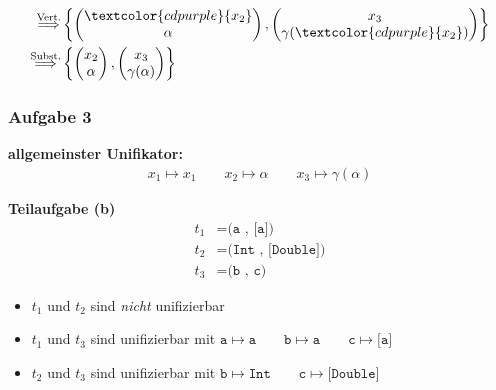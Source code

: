 \documentclass{beamer}
\newcommand{\col}[1]{\textcolor{cdpurple}{#1}}
\begin{document}
\begin{frame}
\begin{align*}
		\overset{\text{Vert.}}{\Longrightarrow}
		&\left\{ \begin{pmatrix}
		\col{x_2} \\ \alpha
		\end{pmatrix}, \begin{pmatrix}
		x_3 \\ \gamma(\col{x_2})
		\end{pmatrix}
		\right\}\\	
		\overset{\text{Subst.}}{\Longrightarrow}
		&\left\{ \begin{pmatrix}
		x_2 \\ \alpha
		\end{pmatrix}, \begin{pmatrix}
		x_3 \\ \gamma(\alpha)
		\end{pmatrix}
		\right\}\\	
	\end{align*}
\end{frame}

\begin{frame} \frametitle{Aufgabe 3}
	\textbf{allgemeinster Unifikator:}
	\begin{align*}
		x_1 \mapsto x_1 \qquad
		x_2 \mapsto \alpha \qquad
		x_3 \mapsto \gamma(\alpha)
	\end{align*}
	
	\pause
	
	\textbf{Teilaufgabe (b)}
	\begin{align*}
		t_1 &= \texttt{(a , [a])} \\
		t_2 &= \texttt{(Int , [Double])} \\
		t_3 &= \texttt{(b , c)}
	\end{align*}
	
	\pause
	
	\begin{itemize}
		\item $t_1$ und $t_2$ sind \textit{nicht} unifizierbar
		
		\item $t_1$ und $t_3$ sind unifizierbar mit $\texttt{a} \mapsto \texttt{a} \qquad \texttt{b} \mapsto \texttt{a} \qquad \texttt{c} \mapsto \texttt{[a]}$
		
		\item $t_2$ und $t_3$ sind unifizierbar mit $\texttt{b} \mapsto \texttt{Int} \qquad \texttt{c} \mapsto \texttt{[Double]}$
	\end{itemize}
\end{frame}
\end{document}
